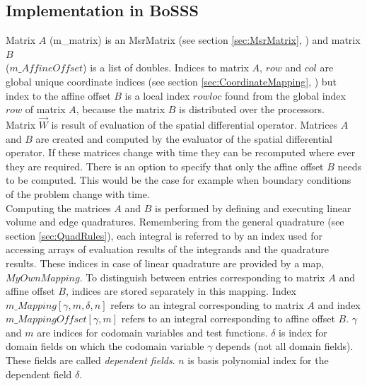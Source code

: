\documentclass[BoSSSForSolvingConservationLaws.tex]{subfiles}
\begin{document}
\subsection*{Implementation in BoSSS}
Matrix $A$ (m\_matrix) is an MsrMatrix (see section \ref{sec:MsrMatrix}, ) and matrix $B$ \\($m\_AffineOffset$) is a list of doubles. Indices to matrix $A$, $row$ and $col$  are global unique coordinate indices (see section \ref{sec:CoordinateMapping}, ) but index to the affine offset $B$ is a local index $rowloc$ found from the global index $row$ of matrix $A$, because the matrix $B$ is distributed over the processors.\\
Matrix $\vec{W}$ is result of evaluation of the spatial differential operator. Matrices $A$ and $B$ are created and computed by the evaluator of the spatial differential operator. If these matrices change with time they can be recomputed where ever they are required. There is an option to specify that only the affine offset $B$ needs to be computed. This would be the case for example when boundary conditions of the problem change with time.\\
Computing the matrices $A$ and $B$ is performed by defining and executing linear volume and edge quadratures. Remembering from the general quadrature (see section \ref{sec:QuadRules}), each integral is referred to by an index used for accessing arrays of evaluation results of the integrands and the quadrature results. These indices in case of linear quadrature are provided by a map, $MyOwnMapping$. To distinguish between entries corresponding to matrix $A$ and affine offset $B$, indices are stored separately in this mapping. Index $m\_Mapping[\gamma,m,\delta,n]$ refers to an integral corresponding to matrix $A$ and index $m\_MappingOffset[\gamma,m]$ refers to an integral corresponding to affine offset $B$. $\gamma$ and $m$ are indices for codomain variables and test functions. $\delta$ is index for domain fields on which the codomain variable $\gamma$ depends (not all domain fields). These fields are called \emph{dependent fields}. $n$ is basis polynomial index for the dependent field $\delta$.
\end{document}
